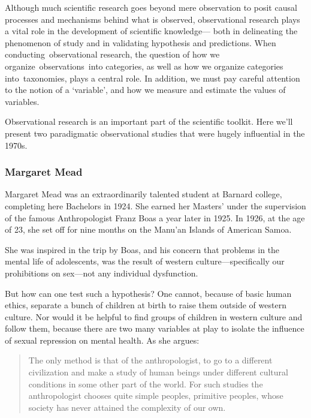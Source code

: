\begin{refsection}
Although much scientific research goes beyond mere observation to posit causal processes and mechanisms behind what is observed, observational research plays a vital role in the development of scientific knowledge--- both in delineating the phenomenon of study and in validating hypothesis and predictions. When conducting observational research, the question of how we organize observations into categories, as well as how we organize categories into taxonomies, plays a central role. In addition, we must pay careful attention to the notion of a `variable', and how we measure and estimate the values of variables.

Observational research is an important part of the scientific toolkit. Here we'll present two paradigmatic observational studies that were hugely influential in the 1970s.

\subsubsection{Margaret Mead}
\label{margaretmead}

Margaret Mead was an extraordinarily talented student at Barnard college, completing here Bachelors in 1924. She earned her Masters' under the supervision of the famous Anthropologist Franz Boas a year later in 1925. In 1926, at the age of 23, she set off for nine months on the Manu'an Islands of American Samoa. 

She was inspired in the trip by Boas, and his concern that problems in the mental life of adolescents, was the result of western culture---specifically our prohibitions on sex---not any individual dysfunction. 

But how can one test such a hypothesis? One cannot, because of basic human ethics, separate a bunch of children at birth to raise them outside of western culture. Nor would it be helpful to find groups of children in western culture and follow them, because there are two many variables at play to isolate the influence of sexual repression on mental health. As she argues:

\begin{quote}

The only method is that of the anthropologist, to go to a different civilization and make a study of human beings under different cultural conditions in some other part of the world. For such studies the anthropologist chooses quite simple peoples, primitive peoples, whose society has never attained the complexity of our own. 
\end{quote}


\end{refsection}

